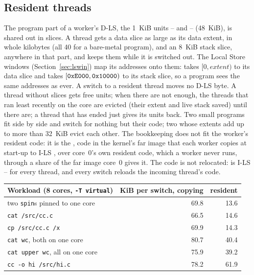 \subsection{Resident threads}\label{sec:os-resident}

The program part of a worker's D-LS, the 1~KiB units -- and --
(48~KiB), is shared out in slices. A thread gets a data slice as large as its data extent, in whole
kilobytes (all 40 for a bare-metal program), and an 8~KiB stack slice, anywhere in that part, and keeps
them while it is switched out. The Local Store windows (Section~\ref{sec:lswin}) map its addresses onto
them:  takes $[0, \textit{extent})$ to its data slice and  takes
$[\texttt{0xE000}, \texttt{0x10000})$ to its stack slice, so a program sees the same addresses as ever. A switch to a
resident thread moves no D-LS byte. A thread without slices gets free units; when there are not
enough, the threads that ran least recently on the core are evicted (their extent and live stack
saved) until there are; a thread that has ended just gives its units back. Two small programs fit side
by side and switch for nothing but their code; two whose extents add up to more than 32~KiB evict each
other. The bookkeeping does not fit the worker's resident code: it is the , code
in the kernel's far image that each worker copies at start-up to I-LS , over core~0's own
resident code, which a worker never runs, through a share of the far image core~0 gives it. The code
is not relocated:  is I-LS -- for every thread, and every switch reloads
the incoming thread's code.

\begin{center}\small
\begin{tabular}{@{}l r r@{}}
\toprule
\textbf{Workload} (8 cores, \texttt{-T virtual}) & \textbf{KiB per switch, copying} & \textbf{resident}\\\midrule
two \texttt{spin}s pinned to one core & 69.8 & 13.6\\
\texttt{cat /src/cc.c} & 66.5 & 14.6\\
\texttt{cp /src/cc.c /x} & 69.9 & 14.3\\
\texttt{cat \textbar{} wc}, both on one core & 80.7 & 40.4\\
\texttt{cat \textbar{} upper \textbar{} wc}, all on one core & 75.9 & 39.2\\
\texttt{cc -o hi /src/hi.c} & 78.2 & 61.9\\
\bottomrule
\end{tabular}
\end{center}

